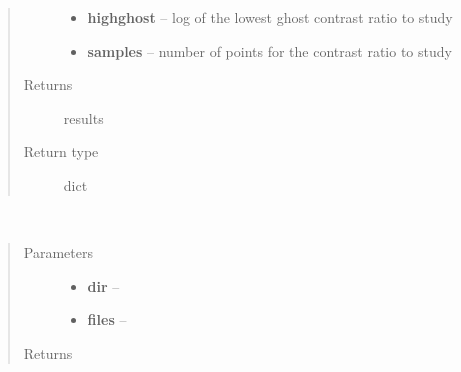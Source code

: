 \documentclass[a4paper,11pt,english]{sphinxmanual}
\begin{document}
\begin{fulllineitems}
\begin{quote}
\begin{description}
\begin{itemize}
\item {} 
\textbf{highghost} -- log of the lowest ghost contrast ratio to study

\item {} 
\textbf{samples} -- number of points for the contrast ratio to study

\end{itemize}

\item[{Returns}] \leavevmode
results

\item[{Return type}] \leavevmode
dict

\end{description}\end{quote}

\end{fulllineitems}


\begin{fulllineitems}
\label{reduction:analysis.analyseGhosts.deleteAndMove}~\begin{quote}\begin{description}
\item[{Parameters}] \leavevmode\begin{itemize}
\item {} 
\textbf{dir} -- 

\item {} 
\textbf{files} -- 

\end{itemize}

\item[{Returns}] \leavevmode


\end{description}\end{quote}

\end{fulllineitems}

\end{document}
